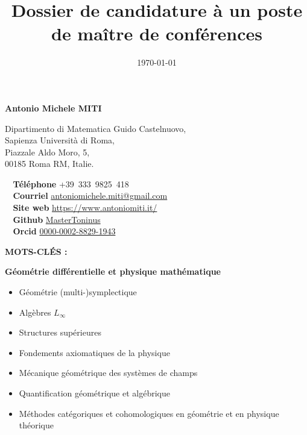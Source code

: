 \documentclass[a4paper]{article}
\title{Dossier de candidature à un poste de maître de conférences}
\author{\vspace{-1em}}
\date{\today}
\newcommand{\skill}[2]{\textbf{#1} \hfill #2 \\}
\begin{document}
\maketitle

	\vfill

	\begin{tcolorbox}
		\begin{center}
			\huge \textbf{Antonio Michele MITI}
		\end{center}
		\vspace{1em}

		\begin{minipage}[t]{0.45\columnwidth}
			Dipartimento di Matematica Guido Castelnuovo,\\
			Sapienza Università di Roma,\\
			Piazzale Aldo Moro, 5,\\
			00185 Roma RM, Italie.\\
		\end{minipage}
		\hfill
		\begin{minipage}[t]{0.45\columnwidth}
			\skill{\faPhone~ Téléphone}{+39~333~9825~418}
			\skill{\faEnvelope~ Courriel}{\href{mailto:antoniomichele.miti@gmail.com}{antoniomichele.miti@gmail.com}}
			\skill{\faGlobe~ Site web}{\href{https://www.antoniomiti.it/}{https://www.antoniomiti.it/}}
			\skill{\faGithubSquare ~ Github}{\href{https://github.com/MasterToninus}{MasterToninus}}
			\skill{~ Orcid}{\href{https://orcid.org/}{0000-0002-8829-1943}}
		\end{minipage}
	\end{tcolorbox}

	\vfill

	\begin{tcolorbox}
		\begin{minipage}[t]{0.2\columnwidth}
			\textbf{MOTS-CLÉS :}
		\end{minipage}
		\hfill
		\begin{minipage}[t]{0.75\columnwidth}
			\textbf{Géométrie différentielle et physique mathématique}
		\begin{itemize}[leftmargin=*, itemsep=0pt, parsep=0pt, topsep=0pt, partopsep=0pt]
			\item[$\cdot$] Géométrie (multi-)symplectique
			\item[$\cdot$] Algèbres $L_\infty$
			\item[$\cdot$] Structures supérieures
			\item[$\cdot$] Fondements axiomatiques de la physique
			\item[$\cdot$] Mécanique géométrique des systèmes de champs
			\item[$\cdot$] Quantification géométrique et algébrique
			\item[$\cdot$] Méthodes catégoriques et cohomologiques en géométrie et en physique théorique
		\end{itemize}
		\end{minipage}
	\end{tcolorbox}
\end{document}
